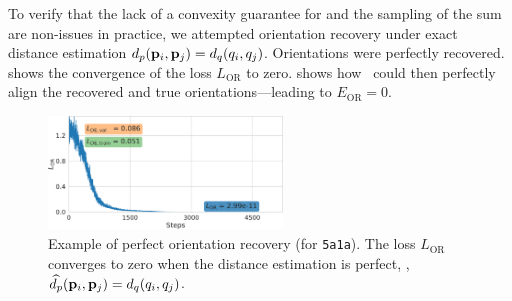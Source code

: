 To verify that the lack of a convexity guarantee for  and the sampling of the sum are non-issues in practice, we attempted orientation recovery under exact distance estimation $d_p(\mathbf{p}_i, \mathbf{p}_j) = d_q(q_i, q_j)$.
Orientations were perfectly recovered.
 shows the convergence of the loss $L_\text{OR}$ to zero.
 shows how~ could then perfectly align the recovered and true orientations---leading to $E_\text{OR} = 0$.

\begin{figure}[ht!]
    \begin{minipage}[t]{0.39\linewidth}
        \centering
        \includegraphics[height=3cm]{figures/5a1a_quartercov_uniformS2_halfInplane_ar_aa}
        \caption{%
            Example of perfect orientation recovery (for \texttt{5a1a}).
            The loss $L_\text{OR}$  converges to zero when the distance estimation is perfect, \ie, $\widehat{d_p}(\mathbf{p}_i, \mathbf{p}_j) = d_q(q_i, q_j)$.
        }\label{fig:5j0n-orientation-recovery-loss}
    \end{minipage}
    \hfill
    \begin{minipage}[t]{0.58\linewidth}

\end{minipage}
\end{figure}
